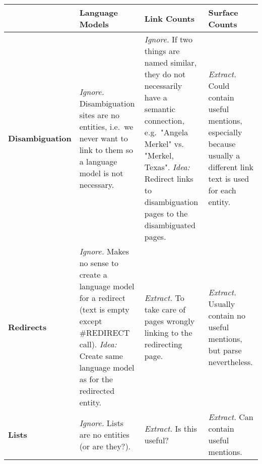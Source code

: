 \documentclass[a4paper, landscape]{article}
\begin{document}
\begin{longtable}{p{3cm}p{5cm}p{5cm}p{5cm}}
	\toprule
	& \textbf{Language Models} & \textbf{Link Counts} & \textbf{Surface Counts} \\

	\midrule
	\textbf{Disambiguation}
		& \emph{\checkmark Ignore.} Disambiguation sites are no entities, i.e.\ we never want to link to them so a language model is not necessary.
		& \emph{\checkmark Ignore.} If two things are named similar, they do not necessarily have a semantic connection, e.g.\ "Angela Merkel" vs. "Merkel, Texas". \emph{Idea:} Redirect links to disambiguation pages to the disambiguated pages.
		& \emph{\checkmark Extract.} Could contain useful mentions, especially because usually a different link text is used for each entity.  \\
	\textbf{Redirects}
		& \emph{\checkmark Ignore.} Makes no sense to create a language model for a redirect (text is empty except \mbox{\#REDIRECT} call). \emph{Idea:} Create same language model as for the redirected entity.
		& \emph{\checkmark Extract.} To take care of pages wrongly linking to the redirecting page.
		& \emph{\checkmark Extract.} Usually contain no useful mentions, but parse nevertheless. \\
	\textbf{Lists}
		& \emph{\checkmark Ignore.} Lists are no entities (or are they?).
		& \emph{\checkmark Extract.} Is this useful?
		& \emph{\checkmark Extract.} Can contain useful mentions.

	\\\bottomrule
\end{longtable}
\end{document}
